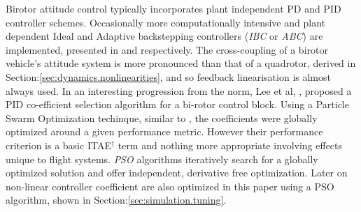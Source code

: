 Birotor attitude control typically incorporates plant independent PD \cite{obliquepitch} and PID \cite{tiltrotorUAV} controller schemes. Occasionally more computationally intensive and plant dependent Ideal and Adaptive backstepping controllers (\emph{IBC} or \emph{ABC}) are implemented, presented in \cite{smalltwotilting,tpheonix} and \cite{adaptivebackstep} respectively. The cross-coupling of a birotor vehicle's attitude system is more pronounced than that of a quadrotor, derived in Section:\ref{sec:dynamics.nonlinearities}, and so feedback linearisation is almost always used. In an interesting progression from the norm, Lee et al,  \cite{autopilotPSO}, proposed a PID co-efficient selection algorithm for a bi-rotor control block. Using a Particle Swarm Optimization techinque, similar to \cite{adaptivepso}, the coefficients were globally optimized around a given performance metric. However their performance criterion is a basic ITAE$^\dagger$ term and nothing more appropriate involving effects unique to flight systems. \emph{PSO} algorithms iteratively search for a globally optimized solution and offer independent, derivative free optimization. Later on non-linear controller coefficient are also optimized in this paper using a PSO algorithm, shown in Section:\ref{sec:simulation.tuning}.
\par
